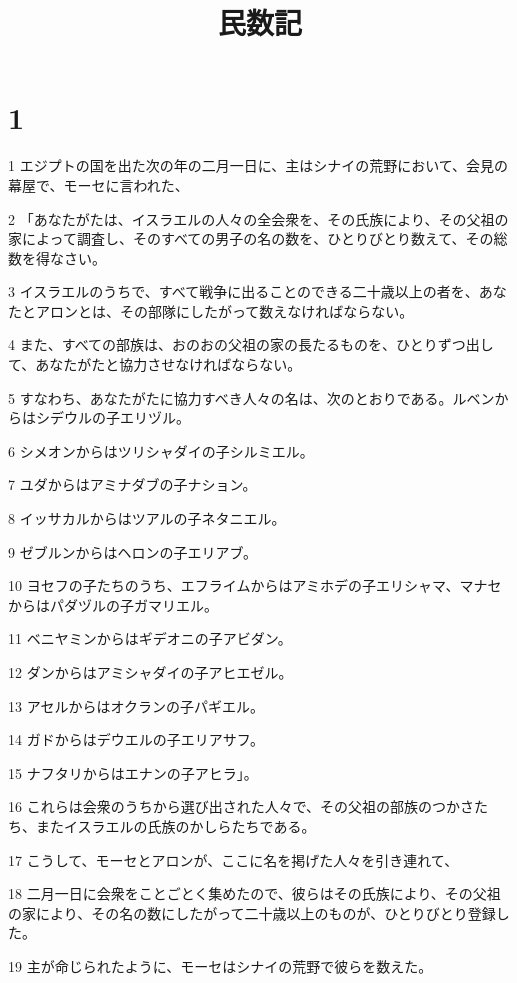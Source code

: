 

\title{民数記}


\chapter{1}

\par 1 エジプトの国を出た次の年の二月一日に、主はシナイの荒野において、会見の幕屋で、モーセに言われた、
\par 2 「あなたがたは、イスラエルの人々の全会衆を、その氏族により、その父祖の家によって調査し、そのすべての男子の名の数を、ひとりびとり数えて、その総数を得なさい。
\par 3 イスラエルのうちで、すべて戦争に出ることのできる二十歳以上の者を、あなたとアロンとは、その部隊にしたがって数えなければならない。
\par 4 また、すべての部族は、おのおの父祖の家の長たるものを、ひとりずつ出して、あなたがたと協力させなければならない。
\par 5 すなわち、あなたがたに協力すべき人々の名は、次のとおりである。ルベンからはシデウルの子エリヅル。
\par 6 シメオンからはツリシャダイの子シルミエル。
\par 7 ユダからはアミナダブの子ナション。
\par 8 イッサカルからはツアルの子ネタニエル。
\par 9 ゼブルンからはヘロンの子エリアブ。
\par 10 ヨセフの子たちのうち、エフライムからはアミホデの子エリシャマ、マナセからはパダヅルの子ガマリエル。
\par 11 ベニヤミンからはギデオニの子アビダン。
\par 12 ダンからはアミシャダイの子アヒエゼル。
\par 13 アセルからはオクランの子パギエル。
\par 14 ガドからはデウエルの子エリアサフ。
\par 15 ナフタリからはエナンの子アヒラ」。
\par 16 これらは会衆のうちから選び出された人々で、その父祖の部族のつかさたち、またイスラエルの氏族のかしらたちである。
\par 17 こうして、モーセとアロンが、ここに名を掲げた人々を引き連れて、
\par 18 二月一日に会衆をことごとく集めたので、彼らはその氏族により、その父祖の家により、その名の数にしたがって二十歳以上のものが、ひとりびとり登録した。
\par 19 主が命じられたように、モーセはシナイの荒野で彼らを数えた。

